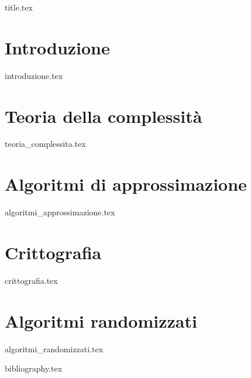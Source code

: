 \documentclass[a4paper,11pt,oneside]{book}
\begin{document}

\frontmatter

{title.tex}

\tableofcontents

\mainmatter


\chapter{Introduzione}
{introduzione.tex}

\chapter{Teoria della complessità}
{teoria_complessita.tex}

\chapter{Algoritmi di approssimazione}
{algoritmi_approssimazione.tex}

\chapter{Crittografia}
{crittografia.tex}

\chapter{Algoritmi randomizzati}
{algoritmi_randomizzati.tex}

\cleardoublepage

{bibliography.tex}
\end{document}
